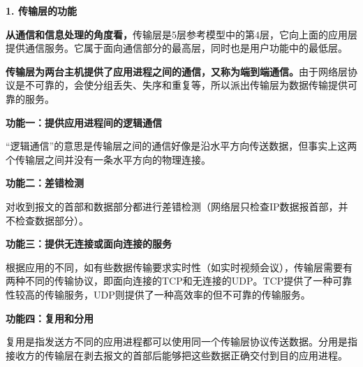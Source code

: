 \textbf{{1. 传输层的功能}}

\textbf{从通信和信息处理的角度看，}传输层是5层参考模型中的第4层，它向上面的应用层提供通信服务。它属于面向通信部分的最高层，同时也是用户功能中的最低层。

\textbf{{传输层为两台主机提供了应用进程之间的通信，又称为端到端通信。}}由于网络层协议是不可靠的，会使分组丢失、失序和重复等，所以派出传输层为数据传输提供可靠的服务。

\textbf{{功能一：提供应用进程间的逻辑通信}}

``逻辑通信''的意思是传输层之间的通信好像是沿水平方向传送数据，但事实上这两个传输层之间并没有一条水平方向的物理连接。

\textbf{{功能二：差错检测}}

对收到报文的首部和数据部分都进行差错检测（网络层只检查IP数据报首部，并不检查数据部分）。

\textbf{{功能三：提供无连接或面向连接的服务}}

根据应用的不同，如有些数据传输要求实时性（如实时视频会议），传输层需要有两种不同的传输协议，即面向连接的TCP和无连接的UDP。TCP提供了一种可靠性较高的传输服务，UDP则提供了一种高效率的但不可靠的传输服务。

\textbf{{功能四：复用和分用}}

复用是指发送方不同的应用进程都可以使用同一个传输层协议传送数据。分用是指接收方的传输层在剥去报文的首部后能够把这些数据正确交付到目的应用进程。
